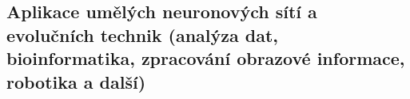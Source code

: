 \subsection{Aplikace umělých neuronových sítí a evolučních technik (analýza dat, bioinformatika, zpracování obrazové informace, robotika a další)}
